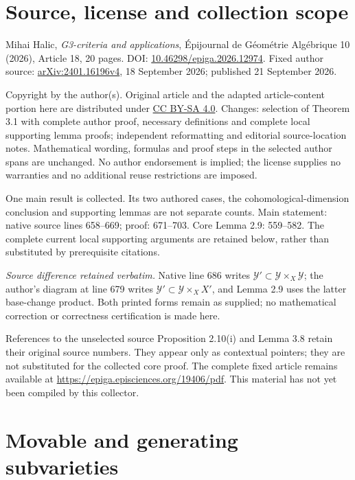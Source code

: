 \documentclass[10pt,a4paper]{article}
\numberwithin{equation}{section}
\theoremstyle{definition}
\theoremstyle{remark}
\begin{document}
\section*{Source, license and collection scope}
\noindent Mihai Halic, \emph{G3-criteria and applications}, \'Epijournal de G\'eom\'etrie Alg\'ebrique 10 (2026), Article 18, 20 pages. DOI: \href{https://doi.org/10.46298/epiga.2026.12974}{10.46298/epiga.2026.12974}. Fixed author source: \href{https://arxiv.org/abs/2401.16196v4}{arXiv:2401.16196v4}, 18 September 2026; published 21 September 2026.
\par\medskip
\noindent Copyright by the author(s). Original article and the adapted article-content portion here are distributed under \href{https://creativecommons.org/licenses/by-sa/4.0/}{CC BY-SA 4.0}. Changes: selection of Theorem 3.1 with complete author proof, necessary definitions and complete local supporting lemma proofs; independent reformatting and editorial source-location notes. Mathematical wording, formulas and proof steps in the selected author spans are unchanged. No author endorsement is implied; the license supplies no warranties and no additional reuse restrictions are imposed.
\par\medskip
\noindent One main result is collected. Its two authored cases, the cohomological-dimension conclusion and supporting lemmas are not separate counts. Main statement: native source lines 658--669; proof: 671--703. Core Lemma 2.9: 559--582. The complete current local supporting arguments are retained below, rather than substituted by prerequisite citations.
\par\medskip
\noindent\textit{Source difference retained verbatim.} Native line 686 writes $\mathcal Y'\subset\mathcal Y\times_X\mathcal Y$; the author's diagram at line 679 writes $\mathcal Y'\subset\mathcal Y\times_X X'$, and Lemma 2.9 uses the latter base-change product. Both printed forms remain as supplied; no mathematical correction or correctness certification is made here.
\par\medskip
\noindent References to the unselected source Proposition 2.10(i) and Lemma 3.8 retain their original source numbers. They appear only as contextual pointers; they are not substituted for the collected core proof. The complete fixed article remains available at \url{https://epiga.episciences.org/19406/pdf}. This material has not yet been compiled by this collector.
\setcounter{section}{1}

\section{Movable and generating subvarieties}\label{sct:gen-fam}
\end{document}

